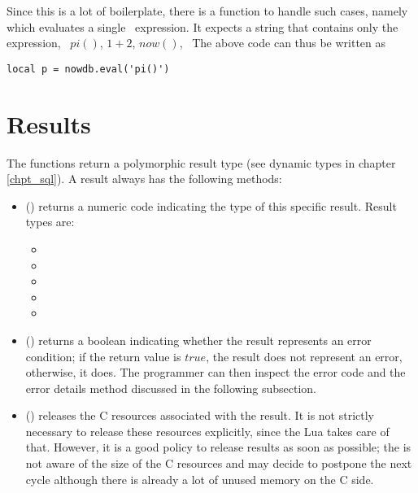 Since this is a lot of boilerplate,
there is a function to handle such cases,
namely  which evaluates
a single \sql\ expression.
It expects a string that
contains only the expression, \eg\
$pi()$, $1+2$, $now()$, \etc\
The above code can thus be written as

\begin{lua}
\begin{lstlisting}
local p = nowdb.eval('pi()')
\end{lstlisting}
\end{lua}

\section{Results}
The  functions return
a polymorphic result type (see dynamic types
in chapter \ref{chpt_sql}).
A result always has the following methods:
\begin{itemize}
\item {}()
      returns a numeric code indicating
      the type of this specific result.
      Result types are:
      \begin{itemize}
      \item {}
      \item {}
      \item \term{nowdb.REPORT}
      \item {}
      \item {}
      \end{itemize}
\item {}()
      returns a boolean indicating whether
      the result represents an error condition;
      if the return value is $true$,
      the result does not represent an error,
      otherwise, it does.
      The programmer can then inspect the error code
      and the error details method discussed in the
      following subsection.
\item \term{release}()
      releases the C resources associated with the result.
      It is not strictly necessary to release these resources
      explicitly, since the Lua  takes care of that.
      However, it is a good policy to release results as soon
      as possible; the \acronym{gc} is not
      aware of the size of the C resources and may decide to
      postpone the next cycle although there is already
      a lot of unused memory on the C side.
\end{itemize}

